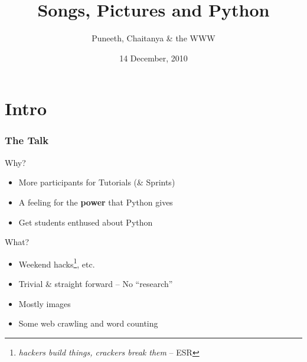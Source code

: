\documentclass[presentation]{beamer}
\begin{document}
\title{Songs, Pictures and Python}
\author{Puneeth,  \newline  Chaitanya   \newline  \&  the WWW}
\date{14 December, 2010}
\maketitle









\section*{Intro}
\label{sec-1}
\begin{frame}
\frametitle{The Talk}
\label{sec-1_1}
\begin{block}{Why?}
\label{sec-1_1_1}

\begin{itemize}
\item More participants for Tutorials (\& Sprints)
\item A feeling for the \textbf{power} that Python gives
\item Get students enthused about Python
\end{itemize}
\end{block}
\begin{block}{What?}
\label{sec-1_1_2}

\begin{itemize}
\item Weekend hacks\footnote{\emph{hackers build things, crackers break them} -- ESR }, etc.
\item Trivial \& straight forward -- No ``research''
\item Mostly images
\item Some web crawling and word counting
\end{itemize}
\end{block}
\end{frame}
\end{document}
